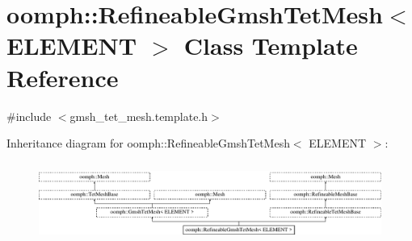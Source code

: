 \hypertarget{classoomph_1_1RefineableGmshTetMesh}{}\section{oomph\+:\+:Refineable\+Gmsh\+Tet\+Mesh$<$ E\+L\+E\+M\+E\+NT $>$ Class Template Reference}
\label{classoomph_1_1RefineableGmshTetMesh}


{\ttfamily \#include $<$gmsh\+\_\+tet\+\_\+mesh.\+template.\+h$>$}

Inheritance diagram for oomph\+:\+:Refineable\+Gmsh\+Tet\+Mesh$<$ E\+L\+E\+M\+E\+NT $>$\+:\begin{figure}[H]
\begin{center}
\leavevmode
\includegraphics[height=2.629108cm]{classoomph_1_1RefineableGmshTetMesh}
\end{center}
\end{figure}
